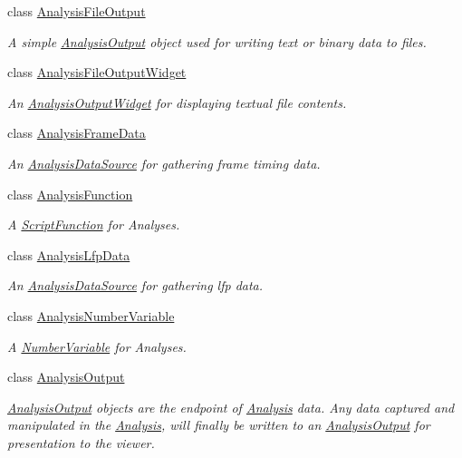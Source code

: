 \begin{DoxyCompactItemize}
class \hyperlink{class_picto_1_1_analysis_file_output}{Analysis\-File\-Output}
\begin{DoxyCompactList}\small\item\em A simple \hyperlink{class_picto_1_1_analysis_output}{Analysis\-Output} object used for writing text or binary data to files. \end{DoxyCompactList}\item 
class \hyperlink{class_picto_1_1_analysis_file_output_widget}{Analysis\-File\-Output\-Widget}
\begin{DoxyCompactList}\small\item\em An \hyperlink{class_picto_1_1_analysis_output_widget}{Analysis\-Output\-Widget} for displaying textual file contents. \end{DoxyCompactList}\item 
class \hyperlink{class_picto_1_1_analysis_frame_data}{Analysis\-Frame\-Data}
\begin{DoxyCompactList}\small\item\em An \hyperlink{class_picto_1_1_analysis_data_source}{Analysis\-Data\-Source} for gathering frame timing data. \end{DoxyCompactList}\item 
class \hyperlink{class_picto_1_1_analysis_function}{Analysis\-Function}
\begin{DoxyCompactList}\small\item\em A \hyperlink{class_picto_1_1_script_function}{Script\-Function} for Analyses. \end{DoxyCompactList}\item 
class \hyperlink{class_picto_1_1_analysis_lfp_data}{Analysis\-Lfp\-Data}
\begin{DoxyCompactList}\small\item\em An \hyperlink{class_picto_1_1_analysis_data_source}{Analysis\-Data\-Source} for gathering lfp data. \end{DoxyCompactList}\item 
class \hyperlink{class_picto_1_1_analysis_number_variable}{Analysis\-Number\-Variable}
\begin{DoxyCompactList}\small\item\em A \hyperlink{class_picto_1_1_number_variable}{Number\-Variable} for Analyses. \end{DoxyCompactList}\item 
class \hyperlink{class_picto_1_1_analysis_output}{Analysis\-Output}
\begin{DoxyCompactList}\small\item\em \hyperlink{class_picto_1_1_analysis_output}{Analysis\-Output} objects are the endpoint of \hyperlink{class_picto_1_1_analysis}{Analysis} data. Any data captured and manipulated in the \hyperlink{class_picto_1_1_analysis}{Analysis}, will finally be written to an \hyperlink{class_picto_1_1_analysis_output}{Analysis\-Output} for presentation to the viewer. \end{DoxyCompactList}\item 

\end{DoxyCompactItemize}
